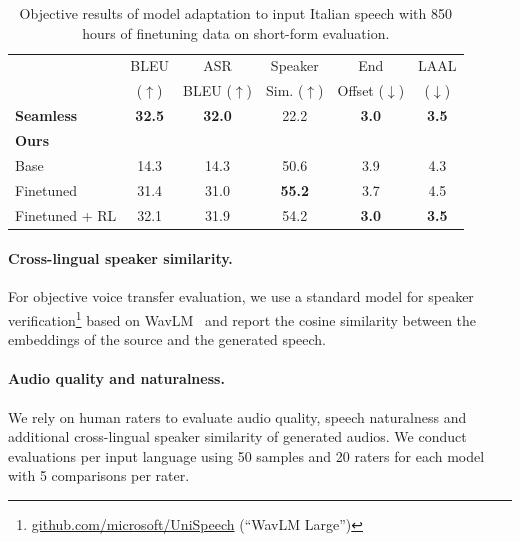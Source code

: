\begin{table}[t]
    \caption{Objective results of model adaptation to input Italian speech with 850 hours of finetuning data on short-form evaluation.}
    \label{tab:italian_results}
    \begin{center}
    \setlength{\tabcolsep}{3pt}
    \begin{scriptsize}
    \begin{sc}
    \begin{tabular}{lccccc}
    \toprule
    & BLEU                  & ASR               & Speaker           & End                   & LAAL \\
    &          ($\uparrow$) & BLEU ($\uparrow$) & Sim. ($\uparrow$) & Offset ($\downarrow$) & ($\downarrow$) \\
    \midrule
    \textbf{Seamless} & \textbf{32.5} & \textbf{32.0} & 22.2 & \textbf{3.0} & \textbf{3.5} \\
    \midrule
    \textbf{Ours} \\
    Base & 14.3 & 14.3 & 50.6 & 3.9 & 4.3 \\  %
    Finetuned & 31.4 & 31.0 & \textbf{55.2} & 3.7 & 4.5 \\  %
    Finetuned + RL & 32.1 & 31.9 & 54.2 & \textbf{3.0} & \textbf{3.5} \\  %
    \bottomrule
    \end{tabular}
    \end{sc}
    \end{scriptsize}
    \end{center}
\end{table}

\paragraph{Cross-lingual speaker similarity.} For objective voice transfer evaluation, we use a standard model for speaker verification\footnote{\href{https://github.com/microsoft/UniSpeech/tree/main/downstreams/speaker\_verification\#pre-trained-models}{github.com/microsoft/UniSpeech} (``WavLM Large'')} based on WavLM~\cite{wavlm} and report the cosine similarity between the embeddings of the source and the generated speech.

\paragraph{Audio quality and naturalness.} We rely on human raters to evaluate audio quality, speech naturalness and additional cross-lingual speaker similarity of generated audios. We conduct evaluations per input language using 50 samples and 20 raters for each model with 5 comparisons per rater.

